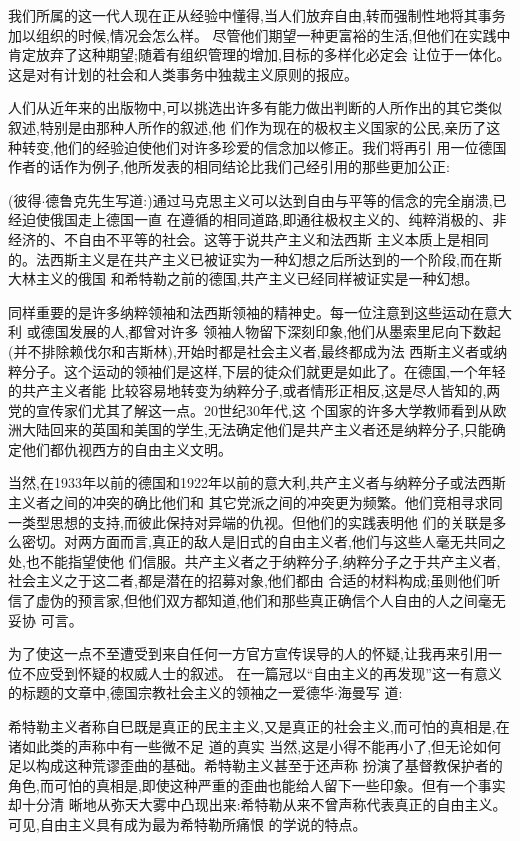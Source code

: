 ﻿\documentclass[12pt]{article}
\begin{document}
我们所属的这一代人现在正从经验中懂得,当人们放弃自由,转而强制性地将其事务加以组织的时候,情况会怎么样。
尽管他们期望一种更富裕的生活,但他们在实践中肯定放弃了这种期望;随着有组织管理的增加,目标的多样化必定会
让位于一体化。这是对有计划的社会和人类事务中独裁主义原则的报应。

人们从近年来的出版物中,可以挑选出许多有能力做出判断的人所作出的其它类似叙述,特别是由那种人所作的叙述,他
们作为现在的极权主义国家的公民,亲历了这种转变,他们的经验迫使他们对许多珍爱的信念加以修正。我们将再引
用一位德国作者的话作为例子,他所发表的相同结论比我们己经引用的那些更加公正:

(彼得$\cdot$德鲁克先生写道:)通过马克思主义可以达到自由与平等的信念的完全崩溃,已经迫使俄国走上德国一直
在遵循的相同道路,即通往极权主义的、纯粹消极的、非经济的、不自由不平等的社会。这等于说共产主义和法西斯
主义本质上是相同的。法西斯主义是在共产主义已被证实为一种幻想之后所达到的一个阶段,而在斯大林主义的俄国
和希特勒之前的德国,共产主义已经同样被证实是一种幻想。

同样重要的是许多纳粹领袖和法西斯领袖的精神史。每一位注意到这些运动在意大利 或德国发展的人,都曾对许多
领袖人物留下深刻印象,他们从墨索里尼向下数起(并不排除赖伐尔和吉斯林),开始时都是社会主义者,最终都成为法
西斯主义者或纳粹分子。这个运动的领袖们是这样,下层的徒众们就更是如此了。在德国,一个年轻的共产主义者能
比较容易地转变为纳粹分子,或者情形正相反,这是尽人皆知的,两党的宣传家们尤其了解这一点。20世纪30年代,这
个国家的许多大学教师看到从欧洲大陆回来的英国和美国的学生,无法确定他们是共产主义者还是纳粹分子,只能确
定他们都仇视西方的自由主义文明。

当然,在1933年以前的德国和1922年以前的意大利,共产主义者与纳粹分子或法西斯主义者之间的冲突的确比他们和
其它党派之间的冲突更为频繁。他们竞相寻求同一类型思想的支持,而彼此保持对异端的仇视。但他们的实践表明他
们的关联是多么密切。对两方面而言,真正的敌人是旧式的自由主义者,他们与这些人毫无共同之处,也不能指望使他
们信服。共产主义者之于纳粹分子,纳粹分子之于共产主义者,社会主义之于这二者,都是潜在的招募对象,他们都由
合适的材料构成;虽则他们听信了虚伪的预言家,但他们双方都知道,他们和那些真正确信个人自由的人之间毫无妥协
可言。

为了使这一点不至遭受到来自任何一方官方宣传误导的人的怀疑,让我再来引用一位不应受到怀疑的权威人士的叙述。
在一篇冠以``自由主义的再发现''这一有意义的标题的文章中,德国宗教社会主义的领袖之一爱德华$\cdot$海曼写
道:

希特勒主义者称自巳既是真正的民主主义,又是真正的社会主义,而可怕的真相是,在诸如此类的声称中有一些微不足
道的真实 \myrule 当然,这是小得不能再小了,但无论如何足以构成这种荒谬歪曲的基础。希特勒主义甚至于还声称
扮演了基督教保护者的角色,而可怕的真相是,即使这种严重的歪曲也能给人留下一些印象。但有一个事实却十分清
晰地从弥天大雾中凸现出来:希特勒从来不曾声称代表真正的自由主义。可见,自由主义具有成为最为希特勒所痛恨
的学说的特点。
\end{document}
